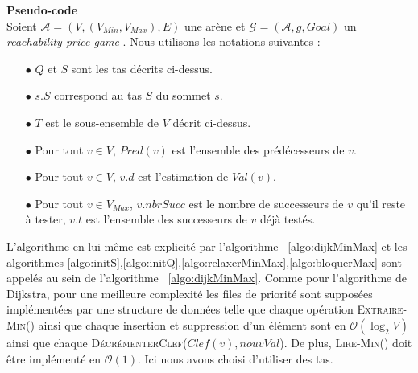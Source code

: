 \noindent \textbf{Pseudo-code}\\

Soient $\mathcal{A} = (V, (V_{Min}, V_{Max}), E) $ une arène et $\mathcal{G} = (\mathcal{A}, g, Goal)$ un \og \textit{reachability-price game} \fg. Nous utilisons les notations suivantes : 
\begin{enumerate} 
	\item[$\bullet$]$Q$ et $S$ sont les tas décrits ci-dessus.
	\item[$\bullet$]$s.S$  correspond au tas $S$ du sommet $s$.
	\item[$\bullet$]$T$ est le sous-ensemble de $V$ décrit ci-dessus.
	\item[$\bullet$]Pour tout $v \in V$, $Pred(v)$ est l'ensemble des prédécesseurs de $v$.
	\item[$\bullet$]Pour tout $v \in V$, $v.d$ est l'estimation de $Val(v)$.
	\item[$\bullet$]Pour tout $v \in V_{Max}$, $v.nbrSucc$ est le nombre de successeurs de $v$ qu'il reste à tester, $v.t$ est l'ensemble des successeurs de $v$ déjà testés.
\end{enumerate}

L'algorithme en lui même est explicité par l'algorithme ~\ref{algo:dijkMinMax} et les algorithmes \ref{algo:initS},\ref{algo:initQ},\ref{algo:relaxerMinMax},\ref{algo:bloquerMax} sont appelés au sein de l'algorithme ~\ref{algo:dijkMinMax}.
Comme pour l'algorithme de Dijkstra, pour une meilleure complexité les files de priorité sont supposées implémentées par une structure de données telle que chaque opération \textsc{Extraire-Min}() ainsi que chaque insertion et suppression d'un élément sont en $\mathcal{O}(\log_2 V)$ ainsi que chaque \textsc{DécrémenterClef}($Clef(v),nouvVal$). De plus, \textsc{Lire-Min()} doit être implémenté en $\mathcal{O}(1)$. Ici nous avons choisi d'utiliser des tas. \\ 


